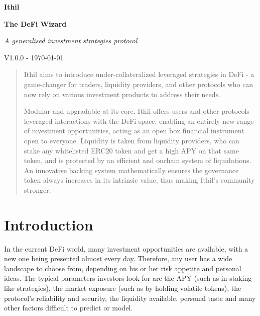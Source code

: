 \documentclass[a4paper,10 pt]{article}
\theoremstyle{definition}
\begin{document}
\begin{titlepage}
    \begin{center}
        \vspace*{1cm}
            
        \Huge
        \textbf{Ithil}

        \vspace{0.5cm}
        \Large
        {\bf The DeFi Wizard}

        \vspace{1cm}
        \Large
        {\it A generalised investment strategies protocol}

        \vspace{1.5cm}
        {\normalsize V1.0.0 - \today}
        \vspace{1.0cm}

        \begin{abstract}        
        Ithil aims to introduce under-collateralized leveraged strategies in DeFi - a game-changer for traders, liquidity providers, and other protocols who can now rely on various investment products to address their needs. 
        
        Modular and upgradable at its core, Ithil offers users and other protocols leveraged interactions with the DeFi space, enabling an entirely new range of investment opportunities, acting as an open box financial instrument open to everyone. Liquidity is taken from liquidity providers, who can stake any whitelisted ERC20 token and get a high APY on that same token, and is protected by an efficient and onchain system of liquidations. An innovative backing system mathematically ensures the governance token always increases in its intrinsic value, thus making Ithil's community stronger.
        \end{abstract}
            
    \end{center}
\tableofcontents
\end{titlepage}

\section{Introduction}

In the current DeFi world, many investment opportunities are available, with a new one being presented almost every day. Therefore, any user has a wide landscape to choose from, depending on his or her risk appetite and personal ideas. The typical parameters investors look for are the APY (such as in staking-like strategies), the market exposure (such as by holding volatile tokens), the protocol's reliability and security, the liquidity available, personal taste and many other factors difficult to predict or model.
\end{document}
